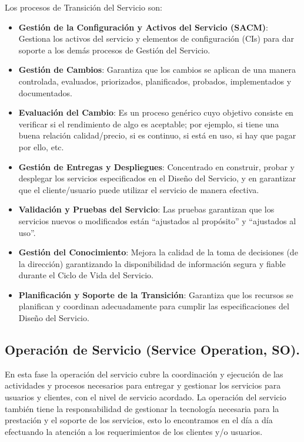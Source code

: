Los procesos de Transición del Servicio son:
\begin{itemize}
	\item \textbf{Gestión de la Configuración y Activos del Servicio (SACM)}: Gestiona los activos del servicio y elementos de configuración (CIs) para dar soporte a los demás procesos de Gestión del Servicio.
	\item	\textbf{Gestión de Cambios}: Garantiza que los cambios se aplican de una manera controlada,  evaluados, priorizados, planificados, probados, implementados y documentados. 
\item	\textbf{Evaluación del Cambio}: Es un proceso genérico cuyo objetivo consiste en verificar si el rendimiento de algo es aceptable; por ejemplo, si tiene una buena relación calidad/precio, si es continuo, si está en uso, si hay que pagar por ello, etc. 
	\item\textbf{	Gestión de Entregas y Despliegues}: Concentrado en construir, probar y desplegar los servicios especificados en el Diseño del Servicio, y en garantizar que el cliente/usuario puede utilizar el servicio de manera efectiva.
	\item\textbf{	Validación y Pruebas del Servicio}: Las pruebas garantizan que los servicios nuevos o modificados están “ajustados al propósito” y “ajustados al uso”. 
	\item	\textbf{Gestión del Conocimiento}: Mejora la calidad de la toma de decisiones (de la dirección) garantizando la disponibilidad de información segura y fiable durante el Ciclo de Vida del Servicio.
	\item\textbf{ Planificación y Soporte de la Transición}: Garantiza que los recursos se planifican y coordinan adecuadamente para cumplir las especificaciones del Diseño del Servicio.
	
\end{itemize}

\subsection{Operación de Servicio (Service Operation, SO).}

En esta fase la operación del servicio cubre la coordinación y ejecución de las actividades y procesos necesarios para entregar y gestionar los servicios para usuarios y clientes, con el nivel de servicio acordado. La operación del servicio también tiene la responsabilidad de gestionar la tecnología necesaria para la prestación y el soporte de los servicios, esto lo  encontramos en el día a día efectuando la atención a los requerimientos de los clientes y/o usuarios. 

